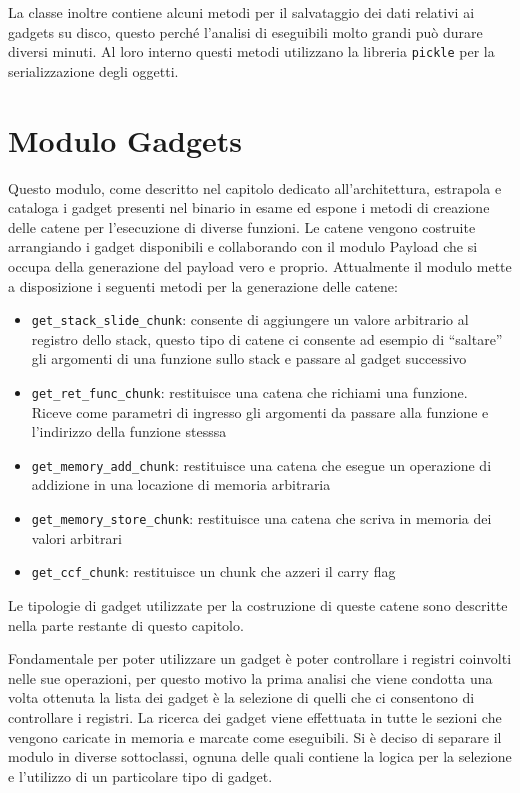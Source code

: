 La classe inoltre contiene alcuni metodi per il salvataggio dei dati
relativi ai gadgets su disco, questo perché l'analisi di eseguibili
molto grandi può durare diversi minuti. Al loro interno questi metodi
utilizzano la libreria \lstinline{pickle} per la serializzazione degli
oggetti. 

\section{Modulo Gadgets}

Questo modulo, come descritto nel capitolo dedicato all'architettura,
estrapola e cataloga i gadget presenti nel binario in esame ed espone
i metodi di creazione delle catene per l'esecuzione di diverse
funzioni. Le catene vengono costruite arrangiando i gadget disponibili
e collaborando con il modulo Payload che si occupa della generazione
del payload vero e proprio. Attualmente il modulo mette a disposizione
i seguenti metodi per la generazione delle catene:
\begin{itemize}
  \item \lstinline{get_stack_slide_chunk}: consente di aggiungere un
    valore arbitrario al registro dello stack, questo tipo di catene
    ci consente ad esempio di ``saltare'' gli argomenti di una
    funzione sullo stack e passare al gadget successivo
  \item \lstinline{get_ret_func_chunk}: restituisce una catena che
    richiami una funzione. Riceve come parametri di ingresso gli
    argomenti da passare alla funzione e l'indirizzo della funzione
    stesssa 
  \item \lstinline{get_memory_add_chunk}: restituisce una catena che
    esegue un operazione di addizione in una locazione di memoria
    arbitraria
  \item \lstinline{get_memory_store_chunk}: restituisce una catena che
    scriva in memoria dei valori arbitrari
  \item \lstinline{get_ccf_chunk}: restituisce un chunk che azzeri il
    carry flag
\end{itemize}

Le tipologie di gadget utilizzate per la costruzione di queste catene
sono descritte nella parte restante di questo capitolo. 

Fondamentale per poter utilizzare un gadget è poter controllare i
registri coinvolti nelle sue operazioni, per questo motivo la prima
analisi che viene condotta una volta ottenuta la lista dei gadget è la
selezione di quelli che ci consentono di controllare i registri. La
ricerca dei gadget viene effettuata in tutte le sezioni che vengono
caricate in memoria e marcate come eseguibili. Si è deciso di separare
il modulo in diverse sottoclassi, ognuna delle quali contiene la
logica per la selezione e l'utilizzo di un particolare tipo di gadget.

